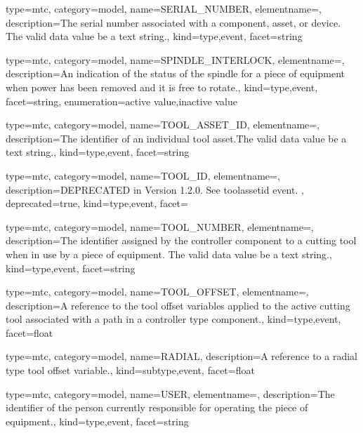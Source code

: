 {
  type=mtc,
  category=model,
  name={SERIAL\_NUMBER},
  elementname=,
  description={The serial number associated with a \gls{component}, \gls{asset}, or \gls{device}. The \gls{valid data value} \must be a text string.},
  kind={type,event},
  facet={\gls{string}}
}


{
  type=mtc,
  category=model,
  name={SPINDLE\_INTERLOCK},
  elementname=,
  description={An indication of the status of the spindle for a piece of equipment when power has been removed and it is free to rotate.},
  kind={type,event},
  facet={\gls{string}},
  enumeration={\gls{active value},\gls{inactive value}}
}


{
  type=mtc,
  category=model,
  name={TOOL\_ASSET\_ID},
  elementname=,
  description={The identifier of an individual tool asset.The \gls{valid data value} \must be a text string.},
  kind={type,event},
  facet={\gls{string}}
}


{
  type=mtc,
  category=model,
  name={TOOL\_ID},
  elementname=,
  description={DEPRECATED in Version 1.2.0.   See \gls{toolassetid event}. },
  deprecated={true},
  kind={type,event},
  facet={}
}


{
  type=mtc,
  category=model,
  name={TOOL\_NUMBER},
  elementname=,
  description={The identifier assigned by the \gls{controller} component to a cutting tool when in use by a piece of equipment. \newline The \gls{valid data value} \must be a text string.},
  kind={type,event},
  facet={\gls{string}}
}


{
  type=mtc,
  category=model,
  name={TOOL\_OFFSET},
  elementname=,
  description={A reference to the tool offset variables applied to the active cutting tool associated with a \gls{path} in a \gls{controller} type component.},
  kind={type,event},
  facet={\gls{float}}
}



{
  type=mtc,
  category=model,
  name={RADIAL},
  description={A reference to a radial type tool offset variable.},
  kind={subtype,event},
  facet={\gls{float}}
}


{
  type=mtc,
  category=model,
  name={USER},
  elementname=,
  description={The identifier of the person currently responsible for operating the piece of equipment.},
  kind={type,event},
  facet={\gls{string}}
}


